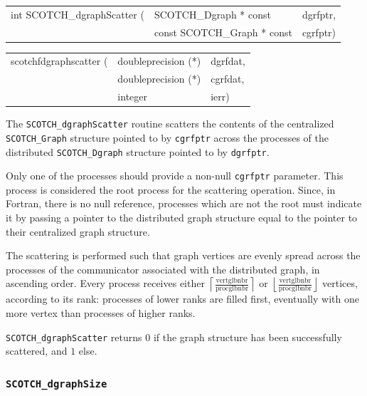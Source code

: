 \begin{itemize}
\progsyn

{\tt\begin{tabular}{l@{}ll}
int SCOTCH\_dgraphScatter ( & SCOTCH\_Dgraph * const      & dgrfptr, \\
                            & const SCOTCH\_Graph * const & cgrfptr)
\end{tabular}}

{\tt\begin{tabular}{l@{}ll}
scotchfdgraphscatter ( & doubleprecision (*) & dgrfdat, \\
                       & doubleprecision (*) & cgrfdat, \\
                       & integer             & ierr)
\end{tabular}}

\progdes

The {\tt SCOTCH\_dgraphScatter} routine scatters the contents of the
centralized {\tt SCOTCH\_\lbt Graph} structure pointed to by
{\tt cgrfptr} across the processes of the distributed
{\tt SCOTCH\_\lbt Dgraph} structure pointed to by {\tt dgrfptr}.

Only one of the processes should provide a non-null {\tt cgrfptr}
parameter. This process is considered the root process for the
scattering operation. Since, in Fortran, there is no null reference,
processes which are not the root must indicate it by passing a pointer
to the distributed graph structure equal to the pointer to their
centralized graph structure.

The scattering is performed such that graph vertices are evenly
spread across the processes of the communicator associated with
the distributed graph, in ascending order. Every process receives
either
$\left\lceil\frac{\mbox{vertglbnbr}}{\mbox{procglbnbr}}\right\rceil$
or
$\left\lfloor\frac{\mbox{vertglbnbr}}{\mbox{procglbnbr}}\right\rfloor$
vertices, according to its rank: processes of lower ranks are filled
first, eventually with one more vertex than processes of higher ranks.

\progret

{\tt SCOTCH\_dgraphScatter} returns $0$ if the graph structure has
been successfully scattered, and $1$ else.
\end{itemize}

\subsubsection{{\tt SCOTCH\_dgraphSize}}

